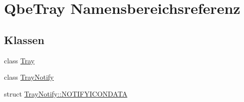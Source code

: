 \hypertarget{namespaceQbeTray}{
\section{Qbe\-Tray Namensbereichsreferenz}
\label{namespaceQbeTray}
}




\subsection*{Klassen}
\begin{CompactItemize}
\item 
class \hyperlink{classQbeTray_1_1Tray}{Tray}
\item 
class \hyperlink{classQbeTray_1_1TrayNotify}{Tray\-Notify}
\item 
struct \hyperlink{structQbeTray_1_1TrayNotify_1_1NOTIFYICONDATA}{Tray\-Notify::NOTIFYICONDATA}
\end{CompactItemize}
